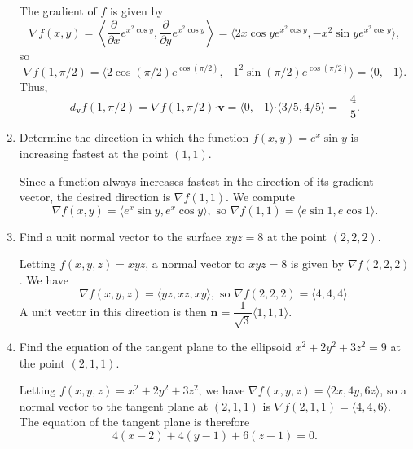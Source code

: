 \documentclass[letterpaper,12pt]{article}
\newcommand{\pd}[2]{\dfrac{\partial #1}{\partial #2}}
\newcommand{\dotp}{\boldsymbol{\cdot}}
\begin{document}
\begin{enumerate}
\bigskip

The gradient of $f$ is given by
\[
 \nabla f(x,y) = \left\langle \pd{}{x}e^{x^2\cos y}, \pd{}{y}e^{x^2\cos y}\right\rangle = \langle 2x\cos ye^{x^2\cos y}, -x^2\sin y e^{x^2\cos y}\rangle,
\]
so 
\[
 \nabla f(1,\pi/2) = \langle 2\cos(\pi/2)e^{\cos (\pi/2)}, -1^2\sin(\pi/2)e^{\cos(\pi/2)}\rangle = \langle 0,-1\rangle.
\]
Thus,
\[
 d_{\mathbf{v}}f(1,\pi/2) = \nabla f(1,\pi/2)\dotp \mathbf{v} = \langle 0, -1\rangle \dotp \langle 3/5, 4/5\rangle = -\frac{4}{5}.
\]

 \item Determine the direction in which the function $f(x,y)=e^x\sin y$ is increasing fastest at the point $(1,1)$.

\bigskip

Since a function always increases fastest in the direction of its gradient vector, the desired direction is $\nabla f(1,1)$. We compute
\[
 \nabla f(x,y) = \langle e^x\sin y, e^x\cos y\rangle, \text{ so } \nabla f(1,1) = \langle e\sin 1, e\cos 1\rangle.
\]

 \item Find a unit normal vector to the surface $xyz=8$ at the point $(2,2,2)$.

\bigskip

Letting $f(x,y,z)=xyz$, a normal vector to $xyz=8$ is given by $\nabla f(2,2,2)$. We have
\[
 \nabla f(x,y,z) = \langle yz, xz, xy\rangle, \text{ so } \nabla f(2,2,2) = \langle 4,4,4\rangle.
\]
A unit vector in this direction is then $\mathbf{n} = \dfrac{1}{\sqrt{3}}\langle 1,1,1\rangle$.

\bigskip

 \item Find the equation of the tangent plane to the ellipsoid $x^2+2y^2+3z^2=9$ at the point $(2,1,1)$.

\bigskip

Letting $f(x,y,z) = x^2+2y^2+3z^2$, we have $\nabla f(x,y,z) = \langle 2x, 4y, 6z\rangle$, so a normal vector to the tangent plane at $(2,1,1)$ is $\nabla f(2,1,1) = \langle 4,4,6\rangle$. The equation of the tangent plane is therefore
\[
 4(x-2)+4(y-1)+6(z-1)=0.
\]

\end{enumerate}
\end{document}

